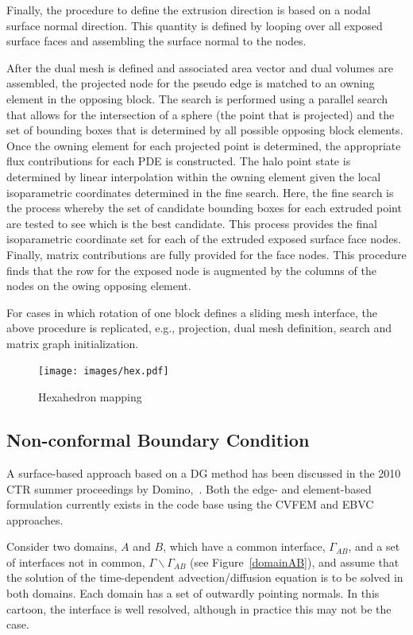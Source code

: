 Finally, the procedure to define the extrusion direction is based on a nodal surface normal direction.
This quantity is defined by looping over all exposed surface faces and assembling the surface normal to the nodes.

After the dual mesh is defined and associated area vector and dual volumes are assembled, the projected
node for the pseudo edge is matched to an owning element in the opposing block. The search is performed using a
parallel search that allows for the intersection of a sphere (the point that is projected) and the set of bounding boxes
that is determined by all possible opposing block elements. Once the owning element for each projected point
is determined, the appropriate flux contributions for each PDE is constructed. The halo point state is determined by linear
interpolation within the owning element given the local isoparametric coordinates determined in the fine search. Here, the 
fine search is the process whereby the set of candidate bounding boxes for each extruded point are tested to see which
is the best candidate. This process provides the final isoparametric coordinate set for each of the extruded exposed surface
face nodes. Finally, matrix contributions are fully provided for the face nodes. This procedure finds that the row for the
exposed node is augmented by the columns of the nodes on the owing opposing element.

For cases in which rotation of one block defines a sliding mesh interface, the above procedure is replicated, e.g., projection,
dual mesh definition, search and matrix graph initialization.
\begin{figure}[ht]
\centerline{\texttt{[image: images/hex.pdf]}}
\vspace{0.1in}
\caption{Hexahedron mapping}
\label{quad-halo}
\end{figure}

\subsection{Non-conformal Boundary Condition}
A surface-based approach based on a DG method has been discussed in the 2010 CTR summer 
proceedings by Domino,~\cite{Domino:2010}. Both the edge- and element-based formulation 
currently exists in the code base using the CVFEM and EBVC approaches. 

Consider two domains, $A$ and $B$, which have a common interface, $\Gamma_{AB}$,
and a set of interfaces not in common, $\Gamma \backslash \Gamma_{AB}$
(see Figure~\ref{domainAB}), and assume that the solution of the 
time-dependent advection/diffusion equation is to be solved in both domains. 
Each domain has a set of outwardly pointing normals. In this cartoon, the interface 
is well resolved, although in practice this may not be the case. 


